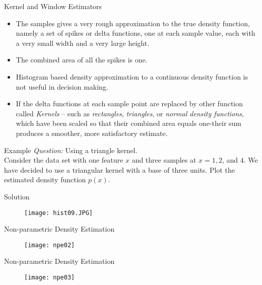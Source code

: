 \begin{frame}{Kernel and Window Estimators}
\begin{itemize}
\item The samples gives a very rough approximation to the true density function, namely a set of spikes or delta functions, one at each sample value, each with a very small width and a very large height.
\item The combined area of all the spikes is one.
\item Histogram based density approximation to  a continuous density function is not useful in decision making.
\item If the delta functions at each sample point are replaced by other function called \textit{\color{sc}Kernels} -- such as \textit{\color{sc}rectangles}, \textit{\color{sc}triangles}, or \textit{\color{sc}normal density functions}, which have been scaled so that their combined area equals one-their sum produces a smoother, more satisfactory estimate.
\end{itemize}
\end{frame}

\begin{frame}{Example}
\textit{\color{mycolor1}Question:} Using a triangle kernel.\\
Consider the data set with one feature $x$ and three samples at $x=1,2$, and $4$. We have decided to use a triangular kernel with a base of three units. Plot the estimated density function $p(x)$.\nocite{duda2012pattern}\nocite{gose1997pattern}
\end{frame}

\begin{frame}{Solution}
\begin{figure}
\texttt{[image: hist09.JPG]}
\end{figure}
\end{frame}

\begin{frame}{Non-parametric Density Estimation}
\begin{figure}
\texttt{[image: npe02]}
\end{figure}
\end{frame}

\begin{frame}{Non-parametric Density Estimation}
\begin{figure}
\texttt{[image: npe03]}
\end{figure}
\end{frame}

